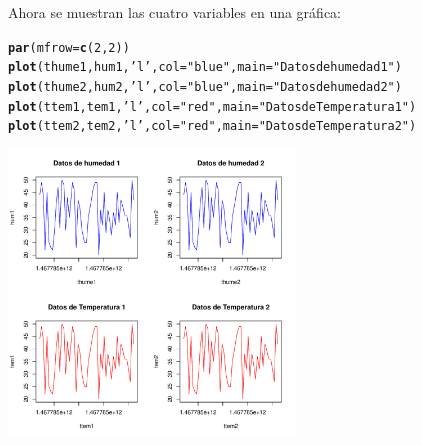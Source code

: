 \documentclass[10pt]{article}\usepackage[]{graphicx}\usepackage[]{color}
\makeatletter
\newcommand{\hlnum}[1]{\textcolor[rgb]{0.686,0.059,0.569}{#1}}%
\newcommand{\hlstr}[1]{\textcolor[rgb]{0.192,0.494,0.8}{#1}}%
\newcommand{\hlstd}[1]{\textcolor[rgb]{0.345,0.345,0.345}{#1}}%
\newcommand{\hlkwc}[1]{\textcolor[rgb]{0.333,0.667,0.333}{#1}}%
\newcommand{\hlkwd}[1]{\textcolor[rgb]{0.737,0.353,0.396}{\textbf{#1}}}%
\newenvironment{kframe}{%
 \def\at@end@of@kframe{}%
 \ifinner\ifhmode%
  \def\at@end@of@kframe{\end{minipage}}%
  \begin{minipage}{\columnwidth}%
 \fi\fi%
 \def\FrameCommand##1{\hskip\@totalleftmargin \hskip-\fboxsep
 \colorbox{shadecolor}{##1}\hskip-\fboxsep
     \hskip-\linewidth \hskip-\@totalleftmargin \hskip\columnwidth}%
 \MakeFramed {\advance\hsize-\width
   \@totalleftmargin\z@ \linewidth\hsize
   \@setminipage}}%
 {\par\unskip\endMakeFramed%
 \at@end@of@kframe}
\newenvironment{knitrout}{}{} %
\makeatother
\begin{document}
Ahora se muestran las cuatro variables en una gráfica:

\begin{center}
\begin{knitrout}
\color{fgcolor}\begin{kframe}
\begin{alltt}
\hlkwd{par}\hlstd{(}\hlkwc{mfrow}\hlstd{=}\hlkwd{c}\hlstd{(}\hlnum{2}\hlstd{,}\hlnum{2}\hlstd{))}
\hlkwd{plot}\hlstd{(thume1,hum1,}\hlstr{'l'}\hlstd{,}\hlkwc{col} \hlstd{=} \hlstr{"blue"}\hlstd{,}\hlkwc{main} \hlstd{=} \hlstr{"Datos de humedad 1"}\hlstd{)}
\hlkwd{plot}\hlstd{(thume2,hum2,}\hlstr{'l'}\hlstd{,}\hlkwc{col} \hlstd{=} \hlstr{"blue"}\hlstd{,}\hlkwc{main} \hlstd{=} \hlstr{"Datos de humedad 2"}\hlstd{)}
\hlkwd{plot}\hlstd{(ttem1,tem1,}\hlstr{'l'}\hlstd{,}\hlkwc{col} \hlstd{=} \hlstr{"red"}\hlstd{,}\hlkwc{main} \hlstd{=} \hlstr{"Datos de Temperatura 1"}\hlstd{)}
\hlkwd{plot}\hlstd{(ttem2,tem2,}\hlstr{'l'}\hlstd{,}\hlkwc{col} \hlstd{=} \hlstr{"red"}\hlstd{,}\hlkwc{main} \hlstd{=} \hlstr{"Datos de Temperatura 2"}\hlstd{)}
\end{alltt}
\end{kframe}
\includegraphics[width=3in]{figure/unnamed-chunk-8-1} 

\end{knitrout}
\end{center}	
 
 
 
 
\newpage		
		
\end{document}
